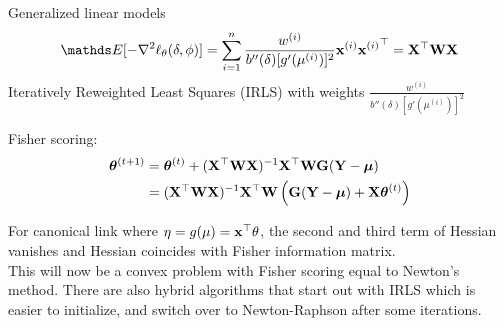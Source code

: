 \documentclass[11pt,compress,t,notes=noshow, xcolor=table]{beamer}
\begin{document}
\begin{vbframe}{Generalized linear models}
$$\E[-\nabla^2 \logl_{\theta}(\delta, \phi)] = \sumin \frac{w^{(i)}}{b''(\delta)[g'(\mu^{(i)})]^2}\xv^{(i)}{\xv^{(i)}}^\top = \mathbf{X}^\top \mathbf{W} \mathbf{X}$$
\lz
Iteratively Reweighted Least Squares (IRLS) with weights $\frac{w^{(i)}}{b''(\delta)[g'(\mu^{(i)})]^2}$\\

\framebreak

Fisher scoring:
\begin{align*}
\bm{\theta}^{(t+1)} &=\bm{\theta}^{(t)} + (\mathbf{X}^\top \mathbf{W} \mathbf{X})^{-1}\mathbf{X}^\top \mathbf{W} \mathbf{G} (\mathbf{Y}-\bm{\mu})\\
& =(\mathbf{X}^\top \mathbf{W} \mathbf{X})^{-1}\mathbf{X}^\top \mathbf{W} \left(\mathbf{G} (\mathbf{Y}-\bm{\mu})+\mathbf{X}\bm{\theta}^{(t)}\right)
\end{align*}

\lz

For canonical link where $\eta = g(\mu) = \mathbf{x}^\top\theta$, the second and third term of Hessian vanishes and Hessian coincides with Fisher information matrix.\\
\lz
This will now be a convex problem with Fisher scoring equal to Newton's method.
\lz
There are also hybrid algorithms that start out with IRLS which is easier to initialize, and switch over to Newton-Raphson after some iterations.

\end{vbframe}

\endlecture
\end{document}
